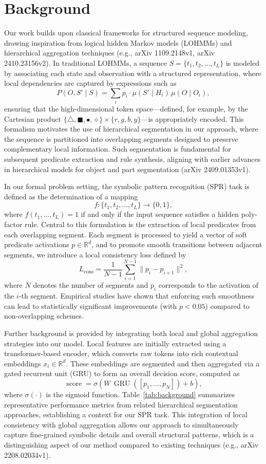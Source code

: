 \documentclass[11pt]{article}
\begin{document}
\section{Background}
Our work builds upon classical frameworks for structured sequence modeling, drawing inspiration from logical hidden Markov models (LOHMMs) and hierarchical aggregation techniques (e.g., arXiv 1109.2148v1, arXiv 2410.23156v2). In traditional LOHMMs, a sequence \(S=\{t_1, t_2, \dots, t_L\}\) is modeled by associating each state and observation with a structured representation, where local dependencies are captured by expressions such as
\[
P(O,S' \mid S)=\sum_{i} p_i \cdot \mu(S' \mid H_i) \, \mu(O \mid O_i),
\]
ensuring that the high-dimensional token space—defined, for example, by the Cartesian product \(\{\triangle,\blacksquare,\bullet,\diamond\}\times\{r, g, b, y\}\)—is appropriately encoded. This formalism motivates the use of hierarchical segmentation in our approach, where the sequence is partitioned into overlapping segments designed to preserve complementary local information. Such segmentation is fundamental for subsequent predicate extraction and rule synthesis, aligning with earlier advances in hierarchical models for object and part segmentation (arXiv 2409.01353v1).

In our formal problem setting, the symbolic pattern recognition (SPR) task is defined as the determination of a mapping 
\[
f: \{t_1, t_2, \dots, t_L\} \rightarrow \{0,1\},
\]
where \(f(t_1, \dots, t_L)=1\) if and only if the input sequence satisfies a hidden poly-factor rule. Central to this formulation is the extraction of local predicates from each overlapping segment. Each segment is processed to yield a vector of soft predicate activations \(p\in \mathbb{R}^d\), and to promote smooth transitions between adjacent segments, we introduce a local consistency loss defined by
\[
L_{\mathrm{cons}}=\frac{1}{N-1}\sum_{i=1}^{N-1}\|p_i-p_{i+1}\|^2,
\]
where \(N\) denotes the number of segments and \(p_i\) corresponds to the activation of the \(i\)-th segment. Empirical studies have shown that enforcing such smoothness can lead to statistically significant improvements (with \(p<0.05\)) compared to non-overlapping schemes.

Further background is provided by integrating both local and global aggregation strategies into our model. Local features are initially extracted using a transformer-based encoder, which converts raw tokens into rich contextual embeddings \(x_i\in\mathbb{R}^d\). These embeddings are segmented and then aggregated via a gated recurrent unit (GRU) to form an overall decision score, computed as
\[
\operatorname{score}=\sigma\left(W\,\operatorname{GRU}([p_1,\dots,p_N])+b\right),
\]
where \(\sigma(\cdot)\) is the sigmoid function. Table~\ref{tab:background} summarizes representative performance metrics from related hierarchical segmentation approaches, establishing a context for our SPR task. This integration of local consistency with global aggregation allows our approach to simultaneously capture fine-grained symbolic details and overall structural patterns, which is a distinguishing aspect of our method compared to existing techniques (e.g., arXiv 2208.02034v1).
\end{document}

